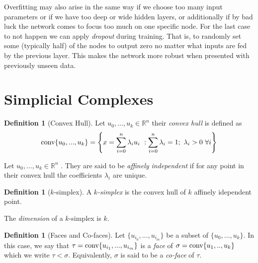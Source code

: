 \documentclass{article}
\newcommand{\R}{\mathbb{R}}
\newcommand{\conv}{\textmd{conv}}
\theoremstyle{plain}
\theoremstyle{definition}
\newtheorem{definition}[thm]{Definition}
\theoremstyle{remark}
\begin{document}
Overfitting may also arise in the same way if we choose too many input parameters or if we have too deep or wide hidden layers, or additionally if by bad luck the network comes to focus too much on one specific node. For the last case to not happen we can apply \emph{dropout} during training. That is, to randomly set some (typically half) of the nodes to output zero no matter what inputs are fed by the previous layer. This makes the network more robust when presented with previously unseen data.

\section{Simplicial Complexes}
\begin{definition}[Convex Hull]
Let $ u_0,...,u_k \in \R^n $ their \emph{convex hull} is defined as
\begin{equation} 
\label{conv-hull}
\conv \{u_0,...,u_k\} = \left\{ x= \sum_{i=0}^{n} \lambda_i u_i \ :    \sum_{i=0}^{n} \lambda_i = 1; \ \lambda_i > 0 \ \forall i \right\} 
\end{equation}
\end{definition}
	
Let $u_0,...,u_k \in \R^n$ . They are said to be \emph{affinely independent }if for any point in their convex hull the coefficients $\lambda_i$ are unique.	

\begin{definition}[$k$-simplex]
A \emph{$k$-simplex} is the convex hull of $k$ affinely idependent point. 
\end{definition}
The \emph{dimension} of a $k$-simplex is $k$.
\begin{definition} [Faces and Co-faces]
Let $ \{u_{i_0},...,u_{i_m} \}$ be a subset of $\{u_0,...,u_k\} $. In this case, we say that $ \tau = \conv\{u_{i_1},...,u_{i_m}\} $ is a \emph{face} of $ \sigma = \conv\{u_1,..,u_k\} $ which we write $ \tau < \sigma $. Equivalently, $ \sigma $ is said to be a \emph{co-face} of $ \tau $.
\end{definition}
	
\end{document}

